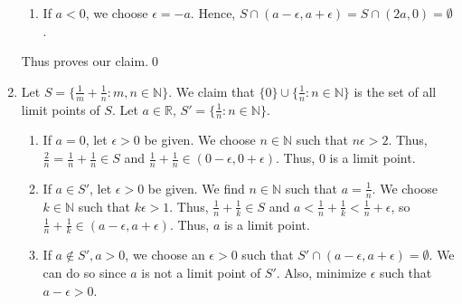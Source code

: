 \documentclass[10pt]{article}
\begin{document}
\begin{enumerate}
\begin{enumerate}
                        \item If $a < 0$, we choose $\epsilon = -a$. Hence, $S \cap (a - \epsilon, a + \epsilon) = 
                        S \cap (2a, 0) = \emptyset$.
                \end{enumerate}
                Thus proves our claim.\qed

                \item Let $S = \{\frac{1}{m} + \frac{1}{n}: m,n \in \mathbb{N}\}$. We claim that $\{0\} \cup \{\frac{1}{n}: n \in \mathbb{N}\}$
                is the set of all limit points of $S$.
                Let $a \in \mathbb{R}$, $S' = \{\frac{1}{n}: n \in \mathbb{N}\}$.
                \begin{enumerate}
                        \item If $a = 0$, let $\epsilon > 0$ be given. We choose $n \in \mathbb{N}$ such that $n\epsilon > 2$.
                        Thus, $\frac{2}{n} = \frac{1}{n} + \frac{1}{n} \in S$ and $\frac{1}{n} + \frac{1}{n} \in (0-\epsilon, 0+\epsilon)$.
                        Thus, $0$ is a limit point.

                        \item If $a \in S'$, let $\epsilon > 0$ be given. We find $n \in \mathbb{N}$
                        such that $a = \frac{1}{n}$.
                        We choose $k \in \mathbb{N}$ such that $k\epsilon > 1$. Thus, $\frac{1}{n} + \frac{1}{k} \in S$ and 
                        $a < \frac{1}{n} + \frac{1}{k} < \frac{1}{n} + \epsilon$, so $\frac{1}{n} + \frac{1}{k} \in (a - \epsilon, a + \epsilon)$.
                        Thus, $a$ is a limit point.

                        \item If $a \notin S', a > 0$, we choose an $\epsilon > 0$ such that $S' \cap (a - \epsilon, a + \epsilon) = \emptyset$.
                        We can do so since $a$ is not a limit point of $S'$. Also, minimize $\epsilon$ such that $a - \epsilon > 0$.


\end{enumerate}
\end{enumerate}
\end{document}
